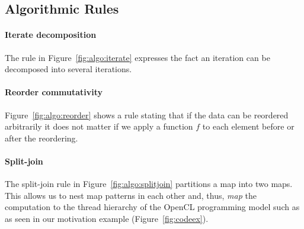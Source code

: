 

\subsection{Algorithmic Rules}




 
\paragraph{Iterate decomposition}
The rule in Figure~\ref{fig:algo:iterate} expresses the fact an iteration can be decomposed into several iterations.

\paragraph{Reorder commutativity}
Figure~\ref{fig:algo:reorder} shows a rule stating that if the data can be reordered arbitrarily it does not matter if we apply a function $f$ to each element before or after the reordering.

\paragraph{Split-join}
The split-join rule in Figure~\ref{fig:algo:splitjoin} partitions a map into two maps.
This allows us to nest map patterns in each other and, thus, \emph{map} the computation to the thread hierarchy of the OpenCL programming model such as  as seen in our motivation example (Figure~\ref{fig:codeex}).


